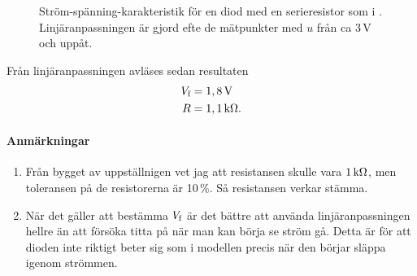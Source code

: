 \documentclass[11pt,a4paper, swedish
]{article}
\begin{document}
\begin{figure}
\centering

\caption{Ström-spänning-karakteristik för en diod med en serieresistor
som i . Linjäranpassningen är gjord efte de
mätpunkter med $u$ från ca 3\,V och uppåt.}
\label{fig:LED}
\end{figure}

Från linjäranpassningen avläses sedan resultaten
\begin{equation*}
\begin{aligned}
\Vf &= \unit[1,8]{V}\\
R &= \unit[1,1]{k\Omega}.
\end{aligned}
\end{equation*}
\paragraph{Anmärkningar} 
\begin{enumerate}
\item Från bygget av uppställnigen vet jag att resistansen skulle vara
  $\unit[1]{k\Omega}$, men toleransen på de resistorerna är 10\,\%. Så
  resistansen verkar stämma.
\item När det gäller att bestämma $V_\text{f}$ är det bättre att använda
  linjäranpassningen hellre än att försöka titta på när man kan börja
  se ström gå. Detta är för att dioden inte riktigt beter sig som i
  modellen precis när den börjar släppa igenom strömmen.
\end{enumerate}



% 
\end{document}
